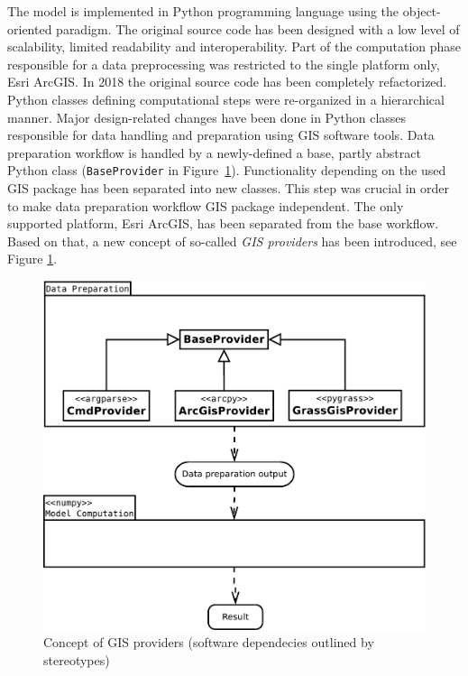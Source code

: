 The model is implemented in Python programming language using the
object-oriented paradigm. The original source code has been designed
with a low level of scalability, limited readability and
interoperability. Part of the computation phase responsible for a data
preprocessing was restricted to the single platform only, Esri ArcGIS. In
2018 the original source code has been completely refactorized. Python
classes defining computational steps were re-organized in a
hierarchical manner. Major design-related changes have been done in
Python classes responsible for data handling and preparation using GIS
software tools. Data preparation workflow is handled by a
newly-defined a base, partly abstract Python class ({\tt BaseProvider}
in Figure~\ref{fig:uml_diagram}). Functionality depending on the used
GIS package has been separated into new classes. This step was crucial
in order to make data preparation workflow GIS package
independent. The only supported platform, Esri ArcGIS, has been
separated from the base workflow. Based on that, a new concept of
so-called {\em GIS providers} has been introduced, see
Figure \ref{fig:uml_diagram}. 

\begin{figure}[ht!]
  \begin{center}
    \includegraphics[width=0.9\columnwidth]{figures/uml_diagram.pdf}
    \caption{Concept of GIS providers (software dependecies outlined by stereotypes)}
    \label{fig:uml_diagram}
  \end{center}
\end{figure}

